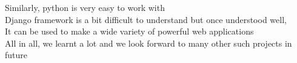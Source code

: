 \documentclass{article}
\begin{document}
\hspace*{5 mm}Similarly, python is very easy to work with  \\
\hspace*{5 mm}Django framework is a bit difficult to understand but once understood well,  \\
\hspace*{5 mm}It can be used to make a wide variety of powerful web applications \\
\hspace*{5 mm}All in all, we learnt a lot and we look forward to many other such projects in future \\
\end{document}
